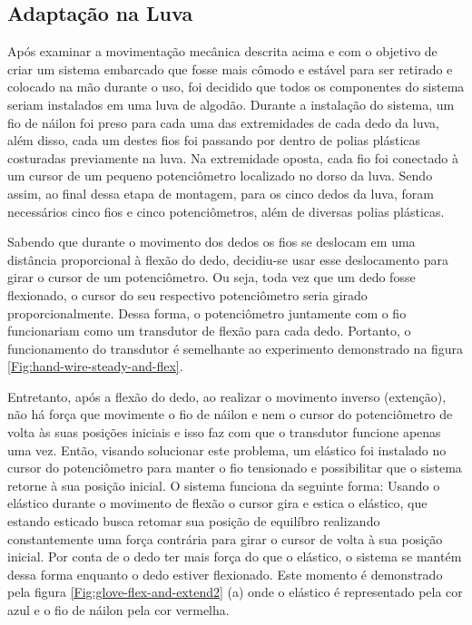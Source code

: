 \documentclass[
	12pt,				%
	openright,			%
	oneside,			%
	a4paper,			%
	english,			%
	brazil				%
	]{abntex2}
\begin{document}
		\subsection{Adaptação na Luva} \label{sub:adaptacao-na-luva}





		Após examinar a movimentação mecânica descrita acima e com o objetivo de criar um sistema embarcado que fosse mais cômodo e estável para ser retirado e colocado na mão durante o uso, foi decidido que todos os componentes do sistema seriam instalados em uma luva de algodão. Durante a instalação do sistema, um fio de náilon foi preso para cada uma das extremidades de cada dedo da luva, além disso, cada um destes fios foi passando por dentro de polias plásticas costuradas previamente na luva. Na extremidade oposta, cada fio foi conectado à um cursor de um pequeno potenciômetro localizado no dorso da luva. Sendo assim, ao final dessa etapa de montagem, para os cinco dedos da luva, foram necessários cinco fios e cinco potenciômetros, além de diversas polias plásticas.

		Sabendo que durante o movimento dos dedos os fios se deslocam em uma distância proporcional à flexão do dedo, decidiu-se usar esse deslocamento para girar o cursor de um potenciômetro. Ou seja, toda vez que um dedo fosse flexionado, o cursor do seu respectivo potenciômetro seria girado proporcionalmente. Dessa forma, o potenciômetro juntamente com o fio funcionariam como um transdutor de flexão para cada dedo. Portanto, o funcionamento do transdutor é semelhante ao experimento demonstrado na figura \ref{Fig:hand-wire-steady-and-flex}. 
		
		Entretanto, após a flexão do dedo, ao realizar o movimento inverso (extenção), não há força que movimente o fio de náilon e nem o cursor do potenciômetro de volta às suas posições iniciais e isso faz com que o transdutor funcione apenas uma vez. Então, visando solucionar este problema, um elástico foi instalado no cursor do potenciômetro para manter o fio tensionado e possibilitar que o sistema retorne à sua posição inicial. O sistema funciona da seguinte forma: Usando o elástico durante o movimento de flexão o cursor gira e estica o elástico, que estando esticado busca retomar sua posição de equilíbro realizando constantemente uma força contrária para girar o cursor de volta à sua posição inicial. Por conta de o dedo ter mais força do que o elástico, o sistema se mantém dessa forma enquanto o dedo estiver flexionado. Este momento é demonstrado pela figura \ref{Fig:glove-flex-and-extend2} (a) onde o elástico é representado pela cor azul e o fio de náilon pela cor vermelha.
\end{document}
